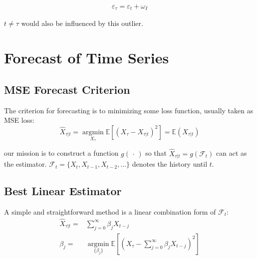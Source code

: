     \begin{align}
        \varepsilon _\tau =\varepsilon _t+\omega _I 
    \end{align}

    $ t\neq \tau $ would also be influenced by this outlier.
    
    
    

    


    
\section{Forecast of Time Series}


\subsection{MSE Forecast Criterion}
    The criterion for forecasting is to minimizing some loss function, usually taken as MSE loss:
    \begin{equation}
        \hat{X}_{\tau|t}= \mathop{\arg\min}\limits_{X_\tau} \mathbb{E}[\left( X_\tau-X_{\tau|t} \right)^2]= \mathbb{E}\left( X_{\tau|t} \right) 
    \end{equation}

    our mission is to construct a function $ g(\,\cdot\,) $ so that $ \hat{X}_{\tau|t}=g(\mathscr{F}_{t}) $ can act as the estimator. $ \mathscr{F}_t=\{X_t,X_{t-1},X_{t-2},\ldots\} $ denotes the history until $ t $.

\subsection{Best Linear Estimator}
    A simple and straightforward method is a linear combination form of $ \mathscr{F}_t $:
    \begin{align}
        \hat{X}_{\tau|t}=&\sum_{j=0}^\infty \beta _jX_{t-j}\\
        \beta _{j}=&\mathop{\arg\min}\limits_{\{\beta _j\}} \mathbb{E}\left[\left( X_\tau-\sum_{j=0}^\infty \beta _jX_{t-j} \right)^2\right]
    \end{align}

